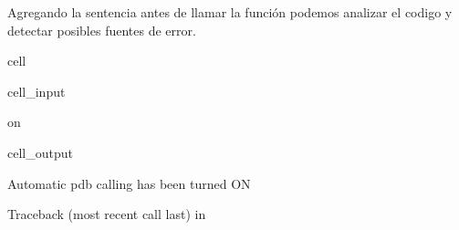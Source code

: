 \documentclass[letterpaper,10pt,english]{jupyterBook}
\begin{document}
\sphinxAtStartPar
Agregando la sentencia  antes de llamar la función podemos analizar el codigo y detectar posibles fuentes de error.

\begin{sphinxuseclass}{cell}\begin{sphinxVerbatimInput}

\begin{sphinxuseclass}{cell_input}
\begin{sphinxVerbatim}[commandchars=\\\{\}]
 on
\end{sphinxVerbatim}

\end{sphinxuseclass}\end{sphinxVerbatimInput}
\begin{sphinxVerbatimOutput}

\begin{sphinxuseclass}{cell_output}
\begin{sphinxVerbatim}[commandchars=\\\{\}]
Automatic pdb calling has been turned ON
\end{sphinxVerbatim}

\begin{sphinxVerbatim}[commandchars=\\\{\}]
Traceback (most recent call last)
 in 
 
  
 


\end{sphinxVerbatim}
\end{sphinxuseclass}
\end{sphinxVerbatimOutput}
\end{sphinxuseclass}
\end{document}
